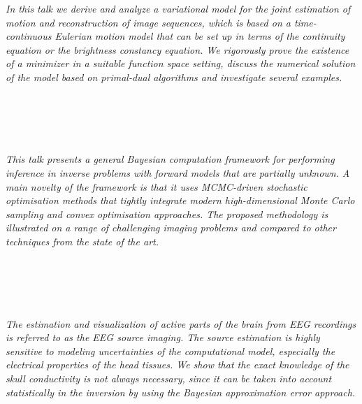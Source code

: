 \begin{multicols}{2}
        \\
        \\\\
        \\
        \\\\
        \\
        \\\\
\\
      \textit{In this talk we derive and analyze a variational model for the joint estimation of motion and reconstruction of image sequences, which is based on a time-continuous Eulerian motion model that can be set up in terms of the continuity equation or the brightness constancy equation. We rigorously prove the existence of a minimizer in a suitable function space setting, discuss the numerical solution of the model based on primal-dual algorithms and investigate several examples.}\\
\\ 
        \\
        \\\\
\\
      \textit{This talk presents a general Bayesian computation framework for performing inference in inverse problems with forward models that are partially unknown. A main novelty of the framework is that it uses MCMC-driven stochastic optimisation methods that tightly integrate modern high-dimensional Monte Carlo sampling and convex optimisation approaches. The proposed methodology is illustrated on a range of challenging imaging problems and compared to other techniques from the state of the art.}\\
\\ 
        \\
        \\\\
\\
      \textit{The estimation and visualization of active parts of the brain from EEG recordings is referred to as the EEG source imaging. The source estimation is highly sensitive to modeling uncertainties of the computational model, especially the electrical properties of the head tissues.  We show that the exact knowledge of the skull conductivity is not always necessary, since it can be taken into account statistically in the inversion by using the Bayesian approximation error approach.}\\

\end{multicols}
